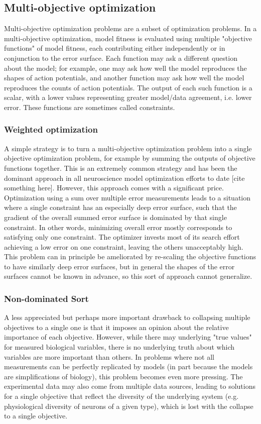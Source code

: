 \subsection{Multi-objective optimization} Multi-objective optimization problems are a subset of optimization problems.
In a multi-objective optimization, model fitness is evaluated using multiple "objective functions" of model fitness, each contributing either independently or in conjunction to the error surface.
Each function may ask a different question about the model; for example, one may ask how well the model reproduces the shapes of action potentials, and another function may ask how well the model reproduces the counts of action potentials.
The output of each such function is a scalar, with a lower values representing greater model/data agreement, i.e. lower error.
These functions are sometimes called constraints. 

\subsubsection{Weighted optimization} A simple strategy is to turn a multi-objective optimization problem into a single objective optimization problem, for example by summing the outputs of objective functions together. 
This is an extremely common strategy and has been the dominant approach in all neuroscience model optimization efforts to date [cite something here].
However, this approach comes with a significant price.
Optimization using a sum over multiple error measurements leads to a situation where a single constraint has an especially deep error surface, such that the gradient of the overall summed error surface is dominated by that single constraint.
In other words, minimizing overall error mostly corresponds to satisfying only one constraint.
The optimizer invests most of its search effort achieving a low error on one constraint, leaving the others unacceptably high.
This problem can in principle be ameliorated by re-scaling the objective functions to have similarly deep error surfaces, but in general the shapes of the error surfaces cannot be known in advance, so this sort of approach cannot generalize.\\

\subsubsection{Non-dominated Sort} A less appreciated but perhaps more important drawback to collapsing multiple objectives to a single one is that it imposes an opinion about the relative importance of each objective.
However, while there may underlying "true values" for measured biological variables, there is no underlying truth about which variables are more important than others.
In problems where not all measurements can be perfectly replicated by models (in part because the models are simplifications of biology), this problem becomes even more pressing.
The experimental data may also come from multiple data sources, leading to solutions for a single objective that reflect the diversity of the underlying system (e.g. physiological diversity of neurons of a given type), which is lost with the collapse to a single objective.

